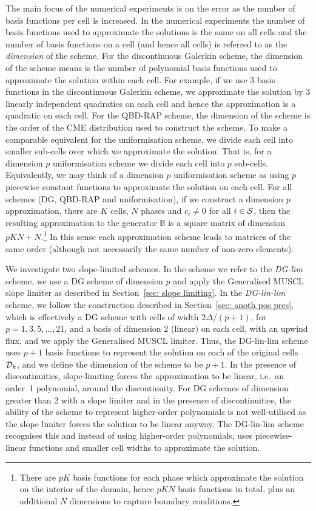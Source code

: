 The main focus of the numerical experiments is on the error as the number of basis functions per cell is increased. In the numerical experiments the number of basis functions used to approximate the solutions is the same on all cells and the number of basis functions on a cell (and hence all cells) is referred to as the \emph{dimension} of the scheme. For the discontinuous Galerkin scheme, the dimension of the scheme means is the number of polynomial basis functions used to approximate the solution within each cell. For example, if we use 3 basis functions in the discontinuous Galerkin scheme, we approximate the solution by 3 linearly independent quadratics on each cell and hence the approximation is a quadratic on each cell. For the QBD-RAP scheme, the dimension of the scheme is the order of the CME distribution used to construct the scheme. To make a comparable equivalent for the uniformisation scheme, we divide each cell into smaller sub-cells over which we approximate the solution. That is, for a dimension \(p\) uniformisation scheme we divide each cell into \(p\) sub-cells. Equivalently, we may think of a dimension \(p\) uniformisation scheme as using \(p\) piecewise constant functions to approximate the solution on each cell. For all schemes (DG, QBD-RAP and uniformisation), if we construct a dimension \(p\) approximation, there are \(K\) cells, \(N\) phases and \(c_i\neq 0\) for all \(i\in\mathcal{S}\), then the resulting approximation to the generator \(\mathbb B\) is a square matrix of dimension \(pKN + N\).\footnote{There are \(pK\) basis functions for each phase which approximate the solution on the interior of the domain, hence \(pKN\) basis functions in total, plus an additional \(N\) dimensions to capture boundary conditions.} In this sense each approximation scheme leads to matrices of the same order (although not necessarily the same number of non-zero elements). 

We investigate two slope-limited schemes. In the scheme we refer to the \emph{DG-lim} scheme, we use a DG scheme of dimension \(p\) and apply the Generalised MUSCL slope limiter as described in Section~\ref{sec: slope limiting}. In the \emph{DG-lin-lim} scheme, we follow the construction described in Section~\ref{sec: anoth pos pres}, which is effectively a DG scheme with cells of width \(2\Delta/(p+1)\), for \(p=1,3,5,...,21\), and a basis of dimension \(2\) (linear) on each cell, with an upwind flux, and we apply the Generalised MUSCL limiter. Thus, the DG-lin-lim scheme uses \(p+1\) basis functions to represent the solution on each of the original cells \(\mathcal{D}_k\), and we define the dimension of the scheme to be \(p+1\). In the presence of discontinuities, slope-limiting forces the approximation to be linear, i.e.~an order~1 polynomial, around the discontinuity. For DG schemes of dimension greater than 2 with a slope limiter and in the presence of discontinuities, the ability of the scheme to represent higher-order polynomials is not well-utilised as the slope limiter forces the solution to be linear anyway. The DG-lin-lim scheme recognises this and instead of using higher-order polynomials, uses piecewise-linear functions and smaller cell widths to approximate the solution. 

